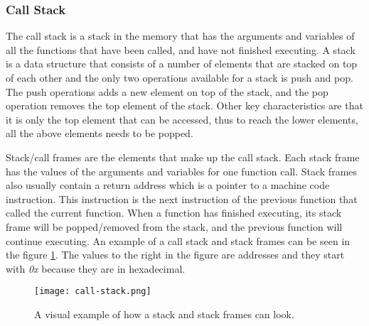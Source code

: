\subsubsection{Call Stack}
The call stack is a stack in the memory that has the arguments and variables of all the functions that have been called, and have not finished executing.
A stack is a data structure that consists of a number of elements that are stacked on top of each other and the only two operations available for a stack is push and pop.
The push operations adds a new element on top of the stack, and the pop operation removes the top element of the stack.
Other key characteristics are that it is only the top element that can be accessed, thus to reach the lower elements, all the above elements needs to be popped.


Stack/call frames are the elements that make up the call stack.
Each stack frame has the values of the arguments and variables for one function call.
Stack frames also usually contain a return address which is a pointer to a machine code instruction.
This instruction is the next instruction of the previous function that called the current function.
When a function has finished executing, its stack frame will be popped/removed from the stack, and the previous function will continue executing. 
An example of a call stack and stack frames can be seen in the figure \ref{fig:callstack}.
The values to the right in the figure are addresses and they start with \emph{0x} because they are in hexadecimal.


\begin{figure}[h]
	\centering
	\texttt{[image: call-stack.png]}
	\caption{A visual example of how a stack and stack frames can look.}
	\label{fig:callstack}
\end{figure}



